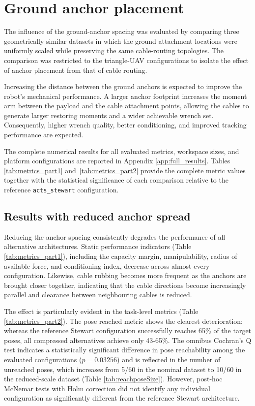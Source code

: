 \section{Ground anchor placement}
\label{sec:ground-placement}
The influence of the ground-anchor spacing was evaluated by comparing three geometrically similar datasets in which the ground attachment locations were uniformly scaled while preserving the same cable-routing topologies. The comparison was restricted to the triangle-UAV configurations to isolate the effect of anchor placement from that of cable routing.

Increasing the distance between the ground anchors is expected to improve the robot's mechanical performance. A larger anchor footprint increases the moment arm between the payload and the cable attachment points, allowing the cables to generate larger restoring moments and a wider achievable wrench set. Consequently, higher wrench quality, better conditioning, and improved tracking performance are expected.

The complete numerical results for all evaluated metrics, workspace sizes, and platform configurations are reported in Appendix \ref{app:full_results}. Tables \ref{tab:metrics_part1} and~\ref{tab:metrics_part2} provide the complete metric values together with the statistical significance of each comparison relative to the reference \texttt{acts\_stewart} configuration.

\subsection{Results with reduced anchor spread}
Reducing the anchor spacing consistently degrades the performance of all alternative architectures. Static performance indicators (Table \ref{tab:metrics_part1}), including the capacity margin, manipulability, radius of available force, and conditioning index, decrease across almost every configuration. Likewise, cable rubbing becomes more frequent as the anchors are brought closer together, indicating that the cable directions become increasingly parallel and clearance between neighbouring cables is reduced.

The effect is particularly evident in the task-level metrics (Table \ref{tab:metrics_part2}). The pose reached metric shows the clearest deterioration: whereas the reference Stewart configuration successfully reaches 65\% of the target poses, all compressed alternatives achieve only 43-65\%. The omnibus Cochran's Q test indicates a statistically significant difference in pose reachability among the evaluated configurations ($p=0.03256$) and is reflected in the number of unreached poses, which increases from 5/60 in the nominal dataset to 10/60 in the reduced-scale dataset (Table \ref{tab:reachposeSize}). However, post-hoc McNemar tests with Holm correction did not identify any individual configuration as significantly different from the reference Stewart architecture.

